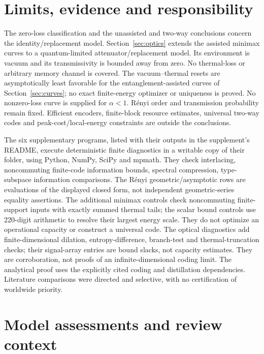 \documentclass[11pt]{article}
\begin{document}
\section{Limits, evidence and responsibility}
The zero-loss classification and the unassisted and two-way conclusions
concern the identity/replacement model. Section~\ref{sec:optics} extends
the assisted minimax curves to a quantum-limited attenuator/replacement
model. Its environment is vacuum and its transmissivity is bounded away
from zero. No thermal-loss or arbitrary memory channel is covered.
The vacuum--thermal resets are asymptotically least favorable for the
entanglement-assisted curves of Section~\ref{sec:curves}; no exact
finite-energy optimizer or uniqueness is proved. No nonzero-loss curve
is supplied for \(\alpha<1\). R\'enyi order and transmission
probability remain fixed. Efficient encoders, finite-block resource
estimates, universal two-way codes and peak-cost/local-energy constraints
are outside the conclusions.

The six supplementary programs, listed with their outputs in the
supplement's README, execute deterministic finite diagnostics in a writable
copy of their folder, using Python, NumPy, SciPy and mpmath.
They check interlacing,
noncommuting finite-code information bounds, spectral compression,
type-subspace information comparisons. The R\'enyi geometric/asymptotic
rows are evaluations of the displayed closed form, not independent
geometric-series equality assertions.
The additional minimax controls check noncommuting finite-support inputs
with exactly summed thermal tails; the scalar bound controls use 220-digit
arithmetic to resolve their largest energy scale. They do not optimize an
operational capacity or construct a universal code. The optical diagnostics
add finite-dimensional dilation, entropy-difference, branch-test and
thermal-truncation checks; their signal-array entries are bound slacks,
not capacity estimates.
They are corroboration, not proofs of an infinite-dimensional coding
limit. The analytical proof uses the explicitly cited coding and
distillation dependencies. Literature comparisons were directed and
selective, with no certification of worldwide priority.

\section*{Model assessments and review context}
\end{document}
